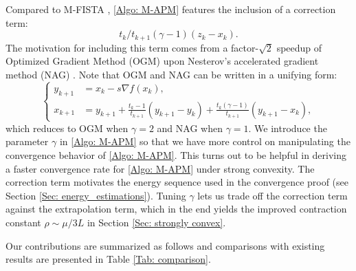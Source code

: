 \documentclass[pdflatex,sn-mathphys-num]{sn-jnl}
\theoremstyle{thmstyleone}
\theoremstyle{thmstyletwo}
\theoremstyle{thmstylethree}
\begin{document}
Compared to M-FISTA \cite{Beck_2009_Monotone}, \eqref{Algo: M-APM} features the inclusion of a correction term:
\begin{equation}\label{E: correction_term}
t_k/t_{k+1}(\gamma-1)(z_k-x_k).
\end{equation}
The motivation for including this term comes from a factor-$\sqrt{2}$ speedup of Optimized Gradient Method (OGM) \cite{Kim_2016,Kim_2017,Park_2023} upon Nesterov's accelerated gradient method (NAG) \cite{Nesterov_1983}. Note that OGM and NAG can be written in a unifying form: 
\begin{equation*}
\left\{
\begin{aligned}
y_{k+1} &= x_k - s\nabla f(x_k),\\
x_{k+1} &= y_{k+1} + \frac{t_k-1}{t_{k+1}}(y_{k+1}-y_k) + \frac{t_k(\gamma-1)}{t_{k+1}}(y_{k+1}-x_k),
\end{aligned}
\right.
\end{equation*}
which reduces to OGM when $\gamma=2$ and NAG when $\gamma=1$. We introduce the parameter $\gamma$ in \eqref{Algo: M-APM} so that we have more control on manipulating the convergence behavior of \eqref{Algo: M-APM}. This turns out to be helpful in deriving a faster convergence rate for \eqref{Algo: M-APM} under strong convexity. The correction term motivates the energy sequence used in the convergence proof (see Section \ref{Sec: energy_estimations}). Tuning $\gamma$ lets us trade off the correction term against the extrapolation term, which in the end yields the improved contraction constant $\rho\sim\mu/3L$ in Section \ref{Sec: strongly convex}. 

Our contributions are summarized as follows and comparisons with existing results are presented in Table \ref{Tab: comparison}.
\end{document}
